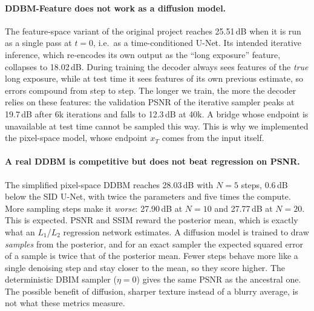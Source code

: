 \paragraph{DDBM-Feature does not work as a diffusion model.} The feature-space variant of the original project reaches 25.51\,dB when it is run as a single pass at $t=0$, i.e.\ as a time-conditioned U-Net. Its intended iterative inference, which re-encodes its own output as the ``long exposure'' feature, collapses to 18.02\,dB. During training the decoder always sees features of the \emph{true} long exposure, while at test time it sees features of its own previous estimate, so errors compound from step to step. The longer we train, the more the decoder relies on these features: the validation PSNR of the iterative sampler peaks at 19.7\,dB after 6k iterations and falls to 12.3\,dB at 40k. A bridge whose endpoint is unavailable at test time cannot be sampled this way. This is why we implemented the pixel-space model, whose endpoint $x_T$ comes from the input itself.

\paragraph{A real DDBM is competitive but does not beat regression on PSNR.} The simplified pixel-space DDBM reaches 28.03\,dB with $N=5$ steps, 0.6\,dB below the SID U-Net, with twice the parameters and five times the compute. More sampling steps make it \emph{worse}: 27.90\,dB at $N=10$ and 27.77\,dB at $N=20$. This is expected. PSNR and SSIM reward the posterior mean, which is exactly what an $L_1$/$L_2$ regression network estimates. A diffusion model is trained to draw \emph{samples} from the posterior, and for an exact sampler the expected squared error of a sample is twice that of the posterior mean. Fewer steps behave more like a single denoising step and stay closer to the mean, so they score higher. The deterministic DBIM sampler ($\eta=0$) gives the same PSNR as the ancestral one. The possible benefit of diffusion, sharper texture instead of a blurry average, is not what these metrics measure.

